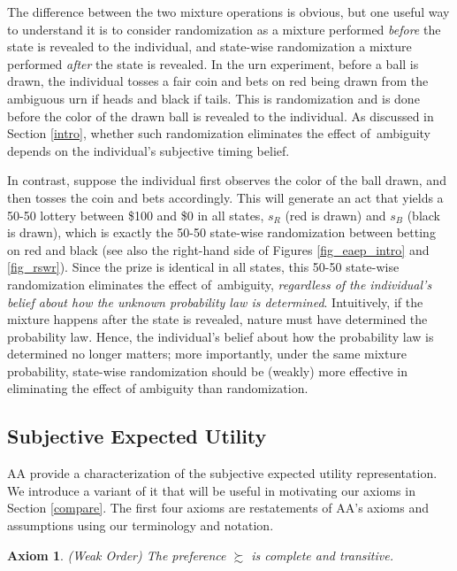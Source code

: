 \documentclass[12pt, notitlepage]{article}
\newtheorem{axiom}{Axiom}
\begin{document}
The difference between the two mixture operations is obvious, but one useful
way to understand it is to consider randomization as a mixture performed 
\textit{before} the state is revealed to the individual, and state-wise
randomization a mixture performed \textit{after} the state is revealed. In
the urn experiment, before a ball is drawn, the individual tosses a fair
coin and bets on red being drawn from the ambiguous urn if heads and black
if tails. This is randomization and is done before the color of the drawn
ball is revealed to the individual. As discussed in Section \ref{intro},
whether such randomization eliminates the effect of\ ambiguity depends on
the individual's subjective timing belief.

In contrast, suppose the individual first observes the color of the ball
drawn, and then tosses the coin and bets accordingly. This will generate an
act that yields a 50-50 lottery between \$100 and \$0 in all states, $s_{R}$
(red is drawn) and $s_{B}$ (black is drawn), which is exactly the 50-50
state-wise randomization between betting on red and black (see also the
right-hand side of Figures \ref{fig_eaep_intro} and \ref{fig_rswr}). Since
the prize is identical in all states, this 50-50 state-wise randomization
eliminates the effect of\ ambiguity, \textit{regardless of the individual's
belief about how the unknown probability law is determined}. Intuitively, if
the mixture happens after the state is revealed, nature must have determined
the probability law. Hence, the individual's belief about how the
probability law is determined no longer matters; more importantly, under the
same mixture probability, state-wise randomization should be (weakly) more
effective in eliminating the effect of ambiguity than randomization.

\subsection{Subjective Expected Utility}

AA provide a characterization of the subjective expected utility
representation. We introduce a variant of it that will be useful in
motivating our axioms in Section \ref{compare}. The first four axioms are
restatements of AA's axioms and assumptions using our terminology and
notation.

\begin{axiom}
(Weak Order) The preference $\succsim $ is complete and transitive.
\end{axiom}
\end{document}
